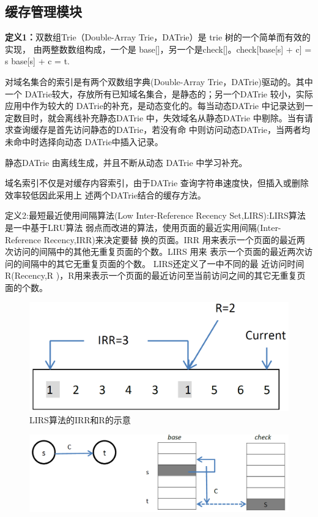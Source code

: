 

\subsection{缓存管理模块} 
\textbf{定义1：}双数组Trie（Double-Array  Trie，DATrie）是 trie 树的一个简单而有效的实现，
由两整数数组构成，一个是 base[]，另一个是check[]。check[base[s] + c] = s base[s]
+ c = t.
\par{对域名集合的索引是有两个双数组字典(Double-Array  Trie，DATrie)驱动的。其中
	一个 DATrie较大，存放所有已知域名集合，是静态的；另一个DATrie 较小，实际应用中作为较大的
	DATrie的补充，是动态变化的。每当动态DATrie 中记录达到一定数目时，就会离线补充静态DATrie
	中，失效域名从静态DATrie 中剔除。当有请求查询缓存是首先访问静态的DATrie，若没有命
	中则访问动态DATrie，当两者均未命中时选择向动态 DATrie中插入记录。 
}
\par{ 静态DATrie 由离线生成，并且不断从动态 DATrie 中学习补充。 }
\par{ 域名索引不仅是对缓存内容索引，由于DATrie 查询字符串速度快，但插入或删除效率较低因此采用上
	述两个DATrie结合的缓存方法。 }
\par{ 定义2:最短最近使用间隔算法(Low  Inter-Reference  Recency  Set,LIRS):LIRS算法是一中基于LRU算法
	弱点而改进的算法，使用页面的最近实用间隔(Inter-Reference Recency,IRR)来决定要替
	换的页面。IRR 用来表示一个页面的最近两次访问的间隔中的其他无重复页面的个数。LIRS 用来
	表示一个页面的最近两次访问的间隔中的其它无重复页面的个数。 LIRS还定义了一中不同的最
	近访问时间R(Recency,R )，R用来表示一个页面的最近访问至当前访问之间的其它无重复页面的个数。 }
\begin{figure}[H]
\centering
\includegraphics[keepaspectratio, scale=0.4]{pitures/irr.png}
\caption{LIRS算法的IRR和R的示意} 
\end{figure}

\begin{figure}[H]
\centering
\includegraphics[keepaspectratio, scale=0.4]{pitures/aaa.png}
\caption{} 
\end{figure}

